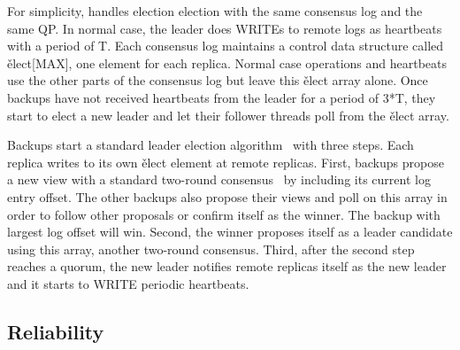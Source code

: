 

For simplicity, \xxx handles election election with the same consensus log and 
the same QP. In normal case, the leader does WRITEs to remote logs as 
heartbeats with a period of T. Each consensus log maintains a control data 
structure called \v{elect[MAX]}, one element for each replica. Normal case 
operations and heartbeats use the other parts of the consensus log but leave 
this \v{elect} array alone. Once backups have not received heartbeats from the 
leader for a period of 3*T, they start to elect a new leader and let their 
follower threads poll from the \v{elect} array.


Backups start a standard \paxos leader election 
algorithm~\cite{paxos:practical} with three steps. Each replica writes to its 
own \v{elect} element at remote replicas. First, backups propose a new view 
with a standard two-round \paxos consensus~\cite{paxos:simple} by including its 
current log entry offset. The other backups also propose their views and poll 
on this array in order to follow other proposals or confirm itself as the 
winner. The backup with largest log offset will win. Second, the winner 
proposes itself as a leader candidate using this array, another two-round 
\paxos consensus. Third, after the second step reaches a quorum, the new leader 
notifies remote replicas itself as the new leader and it starts to WRITE 
periodic heartbeats.

\subsection{Reliability} \label{sec:guarantees}

